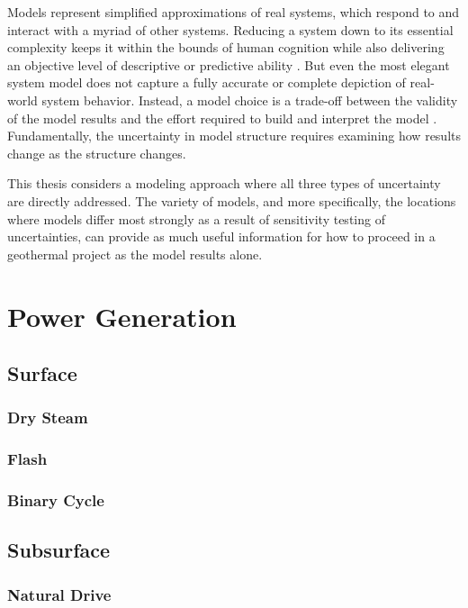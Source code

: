 Models represent simplified approximations of real systems, which respond to and interact with a myriad of other systems. Reducing a system down to its essential complexity keeps it within the bounds of human cognition while also delivering an objective level of descriptive or predictive ability \citep[~p. 306]{crawley_system_2015}. But even the most elegant system model does not capture a fully accurate or complete depiction of real-world system behavior. Instead, a model choice is a trade-off between the validity of the model results and the effort required to build and interpret the model \citep[~p. 23]{morgan_best_2009}. Fundamentally, the uncertainty in model structure requires examining how results change as the structure changes.

This thesis considers a modeling approach where all three types of uncertainty are directly addressed. The variety of models, and more specifically, the locations where models differ most strongly as a result of sensitivity testing of uncertainties, can provide as much useful information for how to proceed in a geothermal project as the model results alone.

\section{Power Generation}\label{ch2:elec}

\subsection{Surface}

\subsubsection{Dry Steam}

\subsubsection{Flash}

\subsubsection{Binary Cycle}

\subsection{Subsurface}

\subsubsection{Natural Drive}

